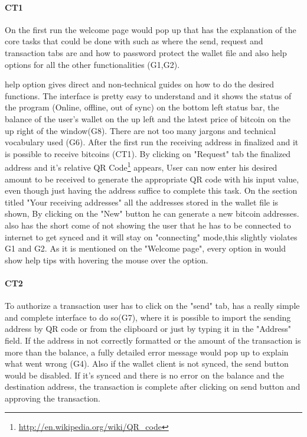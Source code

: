 \paragraph{CT1}On the first run the welcome page would pop up that has the explanation of the core tasks that could be done with \multibit such as where the send, request and transaction tabs are and how to password protect the wallet file and also help options for all the other functionalities (G1,G2). 

\multibit help option gives direct and non-technical guides on how to do the desired functions. The interface is pretty easy to understand and it shows the status of the program (Online, offline, out of sync) on the bottom left  status bar, the balance of the user's wallet on the up left and the latest price of bitcoin on the up right of the window(G8). There are not too many jargons and technical vocabulary used (G6). After the first run the receiving address in finalized and it is possible to receive bitcoins (CT1). By clicking on "Request" tab the finalized address and it's relative QR Code\footnote{\url{http://en.wikipedia.org/wiki/QR_code}} appears, User can now enter his desired amount to be received to generate the appropriate QR code with his input value, even though just having the address suffice to complete this task. On the section titled "Your receiving addresses" all the addresses stored in the wallet file is shown, By clicking on the "New" button he can generate a new bitcoin addresses. \multibit also has the short come of not showing the user that he has to be connected to internet to get synced and it will stay on "connecting" mode,this slightly violates G1 and G2.
As it is mentioned on the "Welcome page", every option in \multibit would show help tips with hovering the mouse over the option.

\paragraph{CT2} To authorize a transaction user has to click on the "send" tab, \multibit has a really simple and complete interface to do so(G7), where it is possible to import the sending address by QR code or from the clipboard or just by typing it in the "Address" field. If the address in not correctly formatted or the amount of the transaction is more than the balance, a fully detailed error message would pop up to explain what went wrong (G4). Also if the wallet client is not synced, the send button would be disabled. If it's synced and there is no error on the balance and the destination address, the transaction is complete after clicking on send button and approving the transaction.


